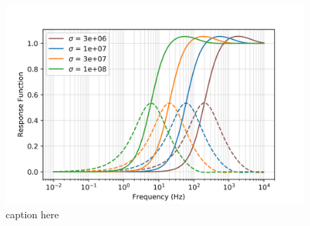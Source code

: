 \begin{figure}
    \begin{center}
    \includegraphics[width=0.6\columnwidth]{figures/augustin_response_function_sigma.png}
    \end{center}
\caption{caption here}
\label{fig:augustin_response_function_sigma}
\end{figure}
